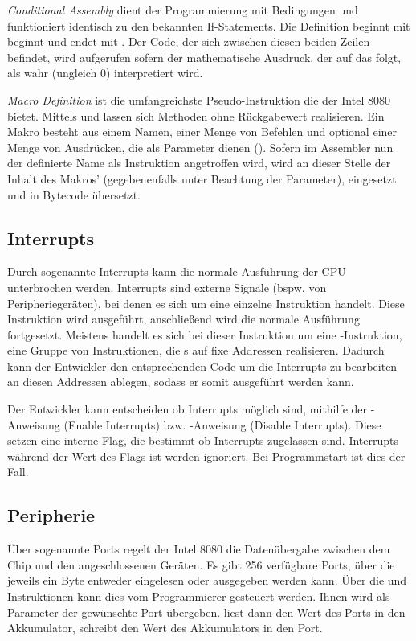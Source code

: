 \textit{Conditional Assembly} dient der Programmierung mit Bedingungen und funktioniert identisch zu den bekannten If-Statements. Die Definition beginnt mit  beginnt und endet mit . Der Code, der sich zwischen diesen beiden Zeilen befindet, wird aufgerufen sofern der mathematische Ausdruck, der auf das  folgt, als wahr (ungleich 0) interpretiert wird.

\textit{Macro Definition} ist die umfangreichste Pseudo-Instruktion die der Intel 8080 bietet. Mittels  und  lassen sich Methoden ohne Rückgabewert realisieren. Ein Makro besteht aus einem Namen, einer Menge von Befehlen und optional einer Menge von Ausdrücken, die als Parameter dienen (). Sofern im Assembler nun der definierte Name als Instruktion angetroffen wird, wird an dieser Stelle der Inhalt des Makros' (gegebenenfalls unter Beachtung der Parameter), eingesetzt und in Bytecode übersetzt.

\subsection{Interrupts}

Durch sogenannte Interrupts kann die normale Ausführung der CPU unterbrochen werden. Interrupts sind externe Signale (bspw. von Peripheriegeräten), bei denen es sich um eine einzelne Instruktion handelt. Diese Instruktion wird ausgeführt, anschließend wird die normale Ausführung fortgesetzt. Meistens handelt es sich bei dieser Instruktion um eine -Instruktion, eine Gruppe von Instruktionen, die s auf fixe Addressen realisieren. Dadurch kann der Entwickler den entsprechenden Code um die Interrupts zu bearbeiten an diesen Addressen ablegen, sodass er somit ausgeführt werden kann.

Der Entwickler kann entscheiden ob Interrupts möglich sind, mithilfe der -Anweisung (Enable Interrupts) bzw. -Anweisung (Disable Interrupts). Diese setzen eine interne Flag, die bestimmt ob Interrupts zugelassen sind. Interrupts während der Wert des Flags  ist werden ignoriert. Bei Programmstart ist dies der Fall.

\subsection{Peripherie}

Über sogenannte Ports regelt der Intel 8080 die Datenübergabe zwischen dem Chip und den angeschlossenen Geräten. 
Es gibt 256 verfügbare Ports, über die jeweils ein Byte entweder eingelesen oder ausgegeben werden kann. Über die  und  Instruktionen kann dies vom Programmierer gesteuert werden. Ihnen wird als Parameter der gewünschte Port übergeben.  liest dann den Wert des Ports in den Akkumulator,  schreibt den Wert des Akkumulators in den Port.

